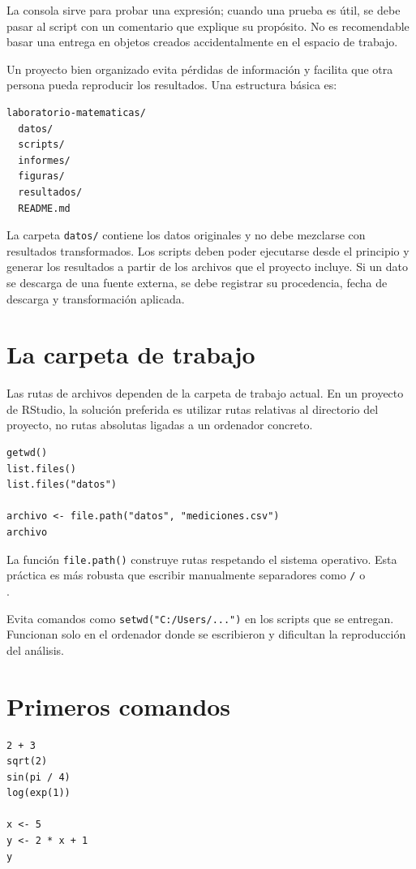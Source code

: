 \documentclass[11pt,a4paper,oneside]{book}
\begin{document}
La consola sirve para probar una expresión; cuando una prueba es útil, se debe pasar al script con un comentario que explique su propósito. No es recomendable basar una entrega en objetos creados accidentalmente en el espacio de trabajo.

Un proyecto bien organizado evita pérdidas de información y facilita que otra persona pueda reproducir los resultados. Una estructura básica es:

\begin{lstlisting}[style=plainstyle]
laboratorio-matematicas/
  datos/
  scripts/
  informes/
  figuras/
  resultados/
  README.md
\end{lstlisting}

La carpeta \texttt{datos/} contiene los datos originales y no debe mezclarse con resultados transformados. Los scripts deben poder ejecutarse desde el principio y generar los resultados a partir de los archivos que el proyecto incluye. Si un dato se descarga de una fuente externa, se debe registrar su procedencia, fecha de descarga y transformación aplicada.

\section{La carpeta de trabajo}
Las rutas de archivos dependen de la carpeta de trabajo actual. En un proyecto de RStudio, la solución preferida es utilizar rutas relativas al directorio del proyecto, no rutas absolutas ligadas a un ordenador concreto.

\begin{lstlisting}[style=rstyle]
getwd()
list.files()
list.files("datos")

archivo <- file.path("datos", "mediciones.csv")
archivo
\end{lstlisting}

La función \texttt{file.path()} construye rutas respetando el sistema operativo. Esta práctica es más robusta que escribir manualmente separadores como \texttt{/} o \texttt{\\}.

\begin{aviso}
Evita comandos como \texttt{setwd("C:/Users/...")} en los scripts que se entregan. Funcionan solo en el ordenador donde se escribieron y dificultan la reproducción del análisis.
\end{aviso}

\section{Primeros comandos}
\begin{lstlisting}[style=rstyle]
2 + 3
sqrt(2)
sin(pi / 4)
log(exp(1))

x <- 5
y <- 2 * x + 1
y
\end{lstlisting}
\end{document}
